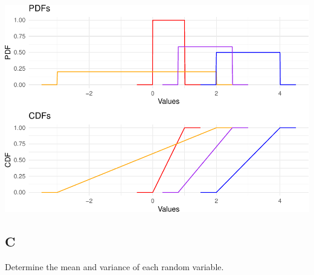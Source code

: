 \documentclass[
]{article}
\begin{document}
\includegraphics{es_files/figure-latex/unnamed-chunk-5-1.pdf}

\hypertarget{c}{%
\subsection{C}\label{c}}

Determine the mean and variance of each random variable.
\end{document}
